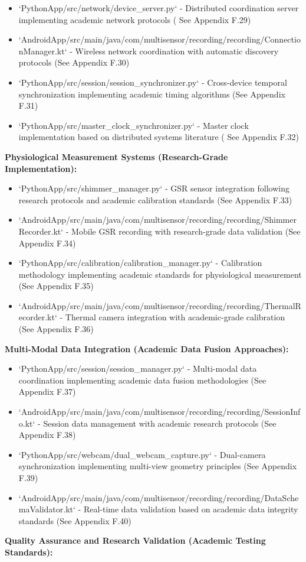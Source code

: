 \documentclass[12pt,a4paper]{report}
\begin{document}
\begin{itemize}
\item `PythonApp/src/network/device_server.py` - Distributed coordination server implementing academic network protocols (
  See Appendix F.29)
\item `AndroidApp/src/main/java/com/multisensor/recording/recording/ConnectionManager.kt` - Wireless network coordination
  with automatic discovery protocols (See Appendix F.30)
\item `PythonApp/src/session/session_synchronizer.py` - Cross-device temporal synchronization implementing academic timing
  algorithms (See Appendix F.31)
\item `PythonApp/src/master_clock_synchronizer.py` - Master clock implementation based on distributed systems literature (
  See Appendix F.32)

\end{itemize}
\textbf{Physiological Measurement Systems (Research-Grade Implementation):}

\begin{itemize}
\item `PythonApp/src/shimmer_manager.py` - GSR sensor integration following research protocols and academic calibration
  standards (See Appendix F.33)
\item `AndroidApp/src/main/java/com/multisensor/recording/recording/ShimmerRecorder.kt` - Mobile GSR recording with
  research-grade data validation (See Appendix F.34)
\item `PythonApp/src/calibration/calibration_manager.py` - Calibration methodology implementing academic standards for
  physiological measurement (See Appendix F.35)
\item `AndroidApp/src/main/java/com/multisensor/recording/recording/ThermalRecorder.kt` - Thermal camera integration with
  academic-grade calibration (See Appendix F.36)

\end{itemize}
\textbf{Multi-Modal Data Integration (Academic Data Fusion Approaches):}

\begin{itemize}
\item `PythonApp/src/session/session_manager.py` - Multi-modal data coordination implementing academic data fusion
  methodologies (See Appendix F.37)
\item `AndroidApp/src/main/java/com/multisensor/recording/recording/SessionInfo.kt` - Session data management with academic
  research protocols (See Appendix F.38)
\item `PythonApp/src/webcam/dual_webcam_capture.py` - Dual-camera synchronization implementing multi-view geometry
  principles (See Appendix F.39)
\item `AndroidApp/src/main/java/com/multisensor/recording/recording/DataSchemaValidator.kt` - Real-time data validation
  based on academic data integrity standards (See Appendix F.40)

\end{itemize}
\textbf{Quality Assurance and Research Validation (Academic Testing Standards):}
\end{document}
